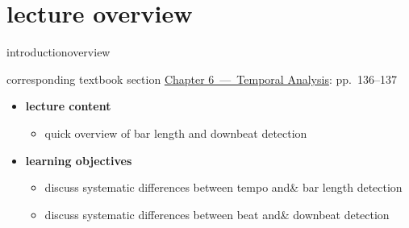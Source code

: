 




\subtitle{Module 6.3: Downbeat and Bar Length Detection}


	

    \section[overview]{lecture overview}
        \begin{frame}{introduction}{overview}
            \begin{block}{corresponding textbook section}
                    \href{http://ieeexplore.ieee.org/xpl/articleDetails.jsp?arnumber=6331123}{Chapter 6~---~Temporal Analysis}: pp.~136--137
            \end{block}

            \begin{itemize}
                \item   \textbf{lecture content}
                    \begin{itemize}
                        \item   quick overview of bar length and downbeat detection
                    \end{itemize}
                \bigskip
                \item<2->   \textbf{learning objectives}
                    \begin{itemize}
                        \item   discuss systematic differences between tempo and\& bar length detection
                        \item   discuss systematic differences between beat and\& downbeat detection
                    \end{itemize}
            \end{itemize}
        \end{frame}

